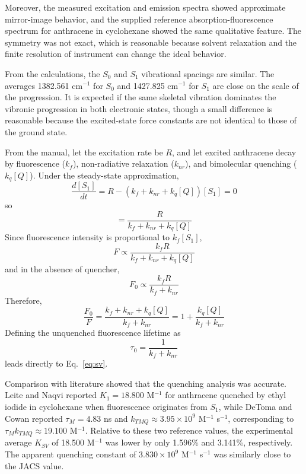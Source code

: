 \documentclass[12pt]{article}
\begin{document}
Moreover, the measured excitation and emission spectra showed approximate mirror-image behavior, and the supplied reference absorption-fluorescence spectrum for anthracene in cyclohexane showed the same qualitative feature.\cite{berlman2012handbook} The symmetry was not exact, which is reasonable because solvent relaxation and the finite resolution of instrument can change the ideal behavior.

From the calculations, the $S_0$ and $S_1$ vibrational spacings are similar. The averages 1382.561 cm$^{-1}$ for $S_0$ and 1427.825 cm$^{-1}$ for $S_1$ are close on the scale of the progression. It is expected if the same skeletal vibration dominates the vibronic progression in both electronic states, though a small difference is reasonable because the excited-state force constants are not identical to those of the ground state.

From the manual\cite{lab_manual}, let the excitation rate be $R$, and let excited anthracene decay by fluorescence ($k_f$), non-radiative relaxation ($k_{nr}$), and bimolecular quenching ($k_q[Q]$). Under the steady-state approximation,
\begin{equation}
\frac{d[S_1]}{dt} = R - (k_f + k_{nr} + k_q[Q])[S_1] = 0
\end{equation}
so
\begin{equation}
[S_1] = \frac{R}{k_f + k_{nr} + k_q[Q]}
\end{equation}
Since fluorescence intensity is proportional to $k_f[S_1]$,
\begin{equation}
F \propto \frac{k_fR}{k_f + k_{nr} + k_q[Q]}
\end{equation}
and in the absence of quencher,
\begin{equation}
F_0 \propto \frac{k_fR}{k_f + k_{nr}}
\end{equation}
Therefore,
\begin{equation}
\frac{F_0}{F} = \frac{k_f + k_{nr} + k_q[Q]}{k_f + k_{nr}} = 1 + \frac{k_q[Q]}{k_f + k_{nr}}
\end{equation}
Defining the unquenched fluorescence lifetime as
\begin{equation}
\tau_0 = \frac{1}{k_f + k_{nr}}
\end{equation}
leads directly to Eq.~\ref{eq:sv}.

Comparison with literature \cite{detoma1975JACS,leite1969CPL} showed that the quenching analysis was accurate. Leite and Naqvi reported $K_1 = 18.800$ M$^{-1}$ for anthracene quenched by ethyl iodide in cyclohexane when fluorescence originates from $S_1$, while DeToma and Cowan reported $\tau_M = 4.83$ ns and $k_{TMQ} \approx 3.95\times10^9$ M$^{-1}$ s$^{-1}$, corresponding to $\tau_M k_{TMQ} \approx 19.100$ M$^{-1}$.\cite{leite1969CPL,detoma1975JACS} Relative to these two reference values, the experimental average $K_{SV}$ of 18.500 M$^{-1}$ was lower by only 1.596\% and 3.141\%, respectively. The apparent quenching constant of $3.830\times10^9$ M$^{-1}$ s$^{-1}$ was similarly close to the JACS value. 
\end{document}
